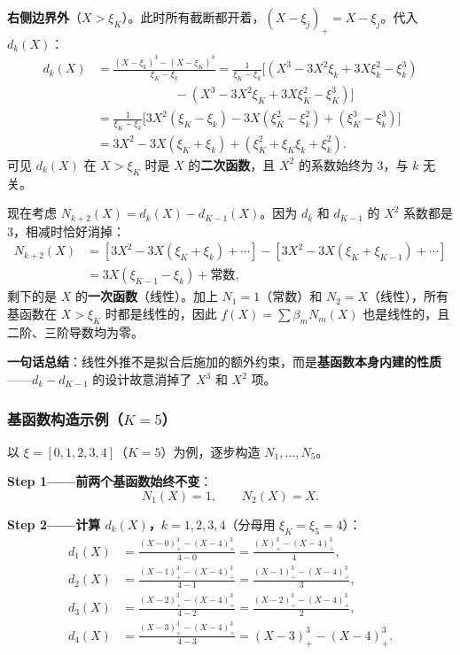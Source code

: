 \textbf{右侧边界外}（$X > \xi_K$）。此时所有截断都开着，$(X-\xi_j)_+ = X - \xi_j$。代入 $d_k(X)$：
\begin{align*}
d_k(X) &= \frac{(X - \xi_k)^3 - (X - \xi_K)^3}{\xi_K - \xi_k}
      = \frac{1}{\xi_K - \xi_k}\Big[(X^3 - 3X^2\xi_k + 3X\xi_k^2 - \xi_k^3) \\
      &\qquad\qquad\qquad\; - (X^3 - 3X^2\xi_K + 3X\xi_K^2 - \xi_K^3)\Big] \\
      &= \frac{1}{\xi_K - \xi_k}\Big[3X^2(\xi_K - \xi_k) - 3X(\xi_K^2 - \xi_k^2) + (\xi_K^3 - \xi_k^3)\Big] \\
      &= 3X^2 - 3X(\xi_K + \xi_k) + (\xi_K^2 + \xi_K\xi_k + \xi_k^2).
\end{align*}
可见 $d_k(X)$ 在 $X > \xi_K$ 时是 $X$ 的\textbf{二次函数}，且 $X^2$ 的系数始终为 $3$，与 $k$ 无关。

现在考虑 $N_{k+2}(X) = d_k(X) - d_{K-1}(X)$。因为 $d_k$ 和 $d_{K-1}$ 的 $X^2$ 系数都是 $3$，相减时恰好消掉：
\begin{align*}
N_{k+2}(X) &= [3X^2 - 3X(\xi_K + \xi_k) + \cdots] - [3X^2 - 3X(\xi_K + \xi_{K-1}) + \cdots] \\
           &= 3X(\xi_{K-1} - \xi_k) + \text{常数},
\end{align*}
剩下的是 $X$ 的\textbf{一次函数}（线性）。加上 $N_1=1$（常数）和 $N_2=X$（线性），所有基函数在 $X > \xi_K$ 时都是线性的，因此 $f(X) = \sum \beta_m N_m(X)$ 也是线性的，且二阶、三阶导数均为零。

\textbf{一句话总结}：线性外推不是拟合后施加的额外约束，而是\textbf{基函数本身内建的性质}——$d_k - d_{K-1}$ 的设计故意消掉了 $X^3$ 和 $X^2$ 项。

\subsubsection{基函数构造示例（$K=5$）}

以 $\xi = [0, 1, 2, 3, 4]$（$K=5$）为例，逐步构造 $N_1,\ldots,N_5$。

\textbf{Step 1——前两个基函数始终不变}：
\[
N_1(X) = 1,\qquad N_2(X) = X.
\]

\textbf{Step 2——计算 $d_k(X)$，$k=1,2,3,4$}（分母用 $\xi_K = \xi_5 = 4$）：
\begin{align*}
d_1(X) &= \frac{(X-0)_+^3 - (X-4)_+^3}{4 - 0}
        = \frac{(X)_+^3 - (X-4)_+^3}{4},\\[4pt]
d_2(X) &= \frac{(X-1)_+^3 - (X-4)_+^3}{4 - 1}
        = \frac{(X-1)_+^3 - (X-4)_+^3}{3},\\[4pt]
d_3(X) &= \frac{(X-2)_+^3 - (X-4)_+^3}{4 - 2}
        = \frac{(X-2)_+^3 - (X-4)_+^3}{2},\\[4pt]
d_4(X) &= \frac{(X-3)_+^3 - (X-4)_+^3}{4 - 3}
        = (X-3)_+^3 - (X-4)_+^3.
\end{align*}

